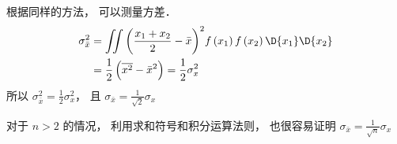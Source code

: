 根据同样的方法， 可以测量方差．
  \begin{equation}
  \begin{aligned}
\sigma_{\bar x}^2 &= \iint {{{\left( {\frac{{{x_1} + {x_2}}}{2} - \bar x} \right)}^2}f\left( {{x_1}} \right)f\left( {{x_2}} \right)\D {x_1}\D {x_2}} \\
&= \frac{1}{2}\left( {\overline {{x^2}}  - {{\bar x}^2}} \right) = \frac{1}{2}\sigma_x^2
\end{aligned} 
\end{equation}
所以 $\sigma_{\bar x}^2 = \frac{1}{2}\sigma_x^2$，  且  ${\sigma_{\bar x}} = \frac{1}{{\sqrt 2 }}{\sigma_x}$ 

对于 $n > 2$ 的情况， 利用求和符号和积分运算法则， 也很容易证明  ${\sigma_{\bar x}} = \frac{1}{{\sqrt n }}{\sigma_x}$ 
